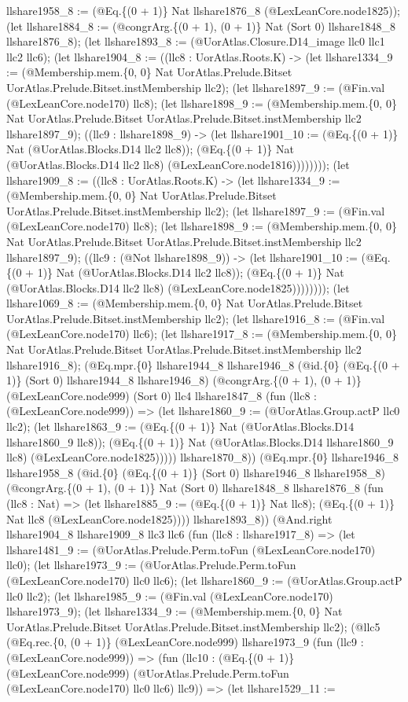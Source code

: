 \documentclass[11pt]{article}
\begin{document}
llshare1958\_8 := (@Eq.\{(0 + 1)\} Nat llshare1876\_8 (@LexLeanCore.node1825)); (let llshare1884\_8 := (@congrArg.\{(0 + 1), (0 + 1)\} Nat (Sort 0) llshare1848\_8 llshare1876\_8); (let llshare1893\_8 := (@UorAtlas.Closure.D14\_image llc0 llc1 llc2 llc6); (let llshare1904\_8 := ((llc8 : UorAtlas.Roots.K) -> (let llshare1334\_9 := (@Membership.mem.\{0, 0\} Nat UorAtlas.Prelude.Bitset UorAtlas.Prelude.Bitset.instMembership llc2); (let llshare1897\_9 := (@Fin.val (@LexLeanCore.node170) llc8); (let llshare1898\_9 := (@Membership.mem.\{0, 0\} Nat UorAtlas.Prelude.Bitset UorAtlas.Prelude.Bitset.instMembership llc2 llshare1897\_9); ((llc9 : llshare1898\_9) -> (let llshare1901\_10 := (@Eq.\{(0 + 1)\} Nat (@UorAtlas.Blocks.D14 llc2 llc8)); (@Eq.\{(0 + 1)\} Nat (@UorAtlas.Blocks.D14 llc2 llc8) (@LexLeanCore.node1816)))))))); (let llshare1909\_8 := ((llc8 : UorAtlas.Roots.K) -> (let llshare1334\_9 := (@Membership.mem.\{0, 0\} Nat UorAtlas.Prelude.Bitset UorAtlas.Prelude.Bitset.instMembership llc2); (let llshare1897\_9 := (@Fin.val (@LexLeanCore.node170) llc8); (let llshare1898\_9 := (@Membership.mem.\{0, 0\} Nat UorAtlas.Prelude.Bitset UorAtlas.Prelude.Bitset.instMembership llc2 llshare1897\_9); ((llc9 : (@Not llshare1898\_9)) -> (let llshare1901\_10 := (@Eq.\{(0 + 1)\} Nat (@UorAtlas.Blocks.D14 llc2 llc8)); (@Eq.\{(0 + 1)\} Nat (@UorAtlas.Blocks.D14 llc2 llc8) (@LexLeanCore.node1825)))))))); (let llshare1069\_8 := (@Membership.mem.\{0, 0\} Nat UorAtlas.Prelude.Bitset UorAtlas.Prelude.Bitset.instMembership llc2); (let llshare1916\_8 := (@Fin.val (@LexLeanCore.node170) llc6); (let llshare1917\_8 := (@Membership.mem.\{0, 0\} Nat UorAtlas.Prelude.Bitset UorAtlas.Prelude.Bitset.instMembership llc2 llshare1916\_8); (@Eq.mpr.\{0\} llshare1944\_8 llshare1946\_8 (@id.\{0\} (@Eq.\{(0 + 1)\} (Sort 0) llshare1944\_8 llshare1946\_8) (@congrArg.\{(0 + 1), (0 + 1)\} (@LexLeanCore.node999) (Sort 0) llc4 llshare1847\_8 (fun (llc8 : (@LexLeanCore.node999)) => (let llshare1860\_9 := (@UorAtlas.Group.actP llc0 llc2); (let llshare1863\_9 := (@Eq.\{(0 + 1)\} Nat (@UorAtlas.Blocks.D14 llshare1860\_9 llc8)); (@Eq.\{(0 + 1)\} Nat (@UorAtlas.Blocks.D14 llshare1860\_9 llc8) (@LexLeanCore.node1825))))) llshare1870\_8)) (@Eq.mpr.\{0\} llshare1946\_8 llshare1958\_8 (@id.\{0\} (@Eq.\{(0 + 1)\} (Sort 0) llshare1946\_8 llshare1958\_8) (@congrArg.\{(0 + 1), (0 + 1)\} Nat (Sort 0) llshare1848\_8 llshare1876\_8 (fun (llc8 : Nat) => (let llshare1885\_9 := (@Eq.\{(0 + 1)\} Nat llc8); (@Eq.\{(0 + 1)\} Nat llc8 (@LexLeanCore.node1825)))) llshare1893\_8)) (@And.right llshare1904\_8 llshare1909\_8 llc3 llc6 (fun (llc8 : llshare1917\_8) => (let llshare1481\_9 := (@UorAtlas.Prelude.Perm.toFun (@LexLeanCore.node170) llc0); (let llshare1973\_9 := (@UorAtlas.Prelude.Perm.toFun (@LexLeanCore.node170) llc0 llc6); (let llshare1860\_9 := (@UorAtlas.Group.actP llc0 llc2); (let llshare1985\_9 := (@Fin.val (@LexLeanCore.node170) llshare1973\_9); (let llshare1334\_9 := (@Membership.mem.\{0, 0\} Nat UorAtlas.Prelude.Bitset UorAtlas.Prelude.Bitset.instMembership llc2); (@llc5 (@Eq.rec.\{0, (0 + 1)\} (@LexLeanCore.node999) llshare1973\_9 (fun (llc9 : (@LexLeanCore.node999)) => (fun (llc10 : (@Eq.\{(0 + 1)\} (@LexLeanCore.node999) (@UorAtlas.Prelude.Perm.toFun (@LexLeanCore.node170) llc0 llc6) llc9)) => (let llshare1529\_11 := 
\end{document}
